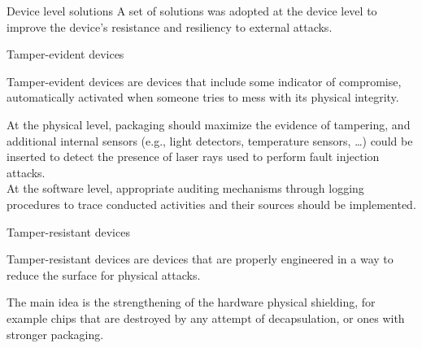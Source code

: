 \begin{section}{Device level solutions}
  A set of solutions was adopted at the device level to improve the device’s resistance and
  resiliency to external attacks.
  \begin{subsection}{Tamper-evident devices}
    \begin{boxH}
      Tamper-evident devices are devices that include some indicator of compromise, automatically
      activated when someone tries to mess with its physical integrity.
    \end{boxH}
    At the physical level, packaging should maximize the evidence of tampering, and additional
    internal sensors (e.g., light detectors, temperature sensors, \dots) could be inserted to detect
    the presence of laser rays used to perform fault injection attacks.\\
    At the software level, appropriate auditing mechanisms through logging procedures to trace
    conducted activities and their sources should be implemented.
  \end{subsection}

  \begin{subsection}{Tamper-resistant devices}
    \begin{boxH}
      Tamper-resistant devices are devices that are properly engineered in a way to reduce the
      surface for physical attacks.
    \end{boxH}
    The main idea is the strengthening of the hardware physical shielding, for example chips that
    are destroyed by any attempt of decapsulation, or ones with stronger packaging.
  \end{subsection}
\end{section}


